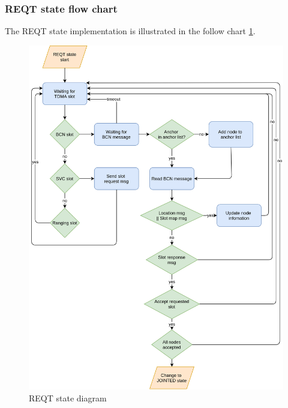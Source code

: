 \documentclass[../../main.tex]{subfiles}
\begin{document}
\subsubsection{REQT state flow chart}
The REQT state implementation is illustrated in the follow chart \ref{fig:REQT_state_diagram}.
\begin{figure}[H]
    \begin{center}
        \includegraphics[scale=0.33]{REQT_flow_chart.png}
    \end{center}
    \caption{REQT state diagram}
    \label{fig:REQT_state_diagram}
\end{figure}
\end{document}
